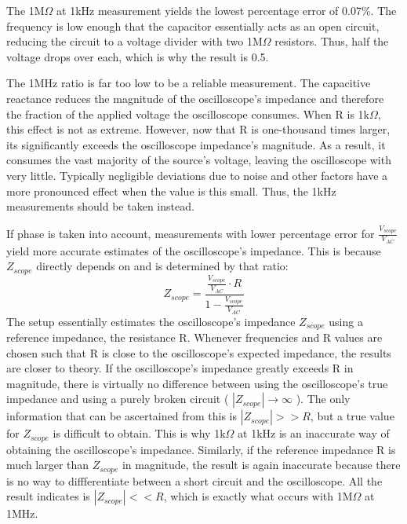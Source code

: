 The 1M$\Omega$ at 1kHz measurement yields the lowest percentage error of 0.07\%. The frequency is low enough that the capacitor essentially acts as an open circuit, reducing the circuit to a voltage divider with two 1M$\Omega$ resistors. Thus, half the voltage drops over each, which is why the result is 0.5.

The 1MHz ratio is far too low to be a reliable measurement. The capacitive reactance reduces the magnitude of the oscilloscope's impedance and therefore the fraction of the applied voltage the oscilloscope consumes. When R is 1k$\Omega$, this effect is not as extreme. However, now that R is one-thousand times larger, its significantly exceeds the oscilloscope impedance's magnitude. As a result, it consumes the vast majority of the source's voltage, leaving the oscilloscope with very little. Typically negligible deviations due to noise and other factors have a more pronounced effect when the value is this small. Thus, the 1kHz measurements should be taken instead.

If phase is taken into account, measurements with lower percentage error for $\frac{V_{scope}}{V_{AC}}$ yield more accurate estimates of the oscilloscope's impedance. This is because $Z_{scope}$ directly depends on and is determined by that ratio:
\begin{equation}
\label{eq:zscope}
Z_{scope} = \frac{\frac{V_{scope}}{V_{AC}} \cdot R }{1 - \frac{V_{scope}}{V_{AC}}}
\end{equation}
The setup essentially estimates the oscilloscope's impedance $Z_{scope}$ using a reference impedance, the resistance R. Whenever frequencies and R values are chosen such that R is close to the oscilloscope's expected impedance, the results are closer to theory. If the oscilloscope's impedance greatly exceeds R in magnitude, there is virtually no difference between using the oscilloscope's true impedance and using a purely broken circuit ( $|Z_{scope}| \rightarrow \infty$ ). The only information that can be ascertained from this is $|Z_{scope}| >> R$, but a true value for $Z_{scope}$ is difficult to obtain. This is why 1k$\Omega$ at 1kHz is an inaccurate way of obtaining the oscilloscope's impedance.
Similarly, if the reference impedance R is much larger than $Z_{scope}$ in magnitude, the result is again inaccurate because there is no way to diffferentiate between a short circuit and the oscilloscope. All the result indicates is $|Z_{scope}| << R$, which is exactly what occurs with 1M$\Omega$ at 1MHz.
